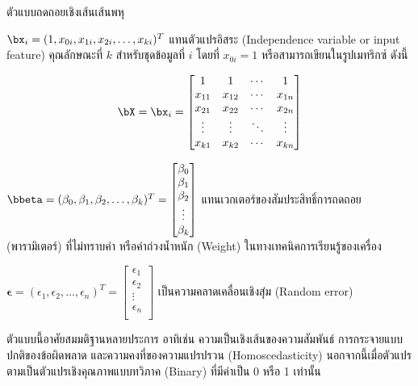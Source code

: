 \begin{myBox}[]{ตัวแบบถดถอยเชิงเส้นเส้นพหุ}{}

\indent\indent
$\bx_i = (1, x_{0i},x_{1i}, x_{2i}, \ldots, x_{ki})^T$ แทนตัวแปรอิสระ (Independence variable or input feature) คุณลักษณะที่ $k$ สำหรับชุดข้อมูลที่ $i$
โดยที่ $x_{0i}=1$ หรือสามารถเขียนในรูปเมทริกซ์ ดังนี้

$$\bX=\bx_i=\begin{bmatrix}
	1 & 1 & \cdots  & 1 \\
	x_{11}& x_{12}& \cdots  & x_{1n} \\
	x_{21}& x_{22}& \cdots & x_{2n}  \\
	\vdots & \vdots  & \ddots  & \vdots  \\
	x_{k1}& x_{k2} & \cdots  & x_{kn} \\
\end{bmatrix}$$

\indent\indent
$\bbeta = (\beta_0, \beta_1, \beta_2, \ldots, \beta_k)^T=\begin{bmatrix}
	\beta_{0}\\
	\beta_{1} \\
	\beta_{2} \\
	\vdots \\
	\beta_{k} \\
\end{bmatrix}$ แทนเวกเตอร์ของสัมประสิทธิ์การถดถอย (พารามิเตอร์) ที่ไม่ทราบค่า หรือค่าถ่วงน้ำหนัก (Weight) ในทางเทคนิคการเรียนรู้ของเครื่อง

\indent\indent
$\bm{\epsilon}=(\epsilon_1, \epsilon_2, \ldots, \epsilon_n)^T=\begin{bmatrix}
	\epsilon_{1} \\
	\epsilon_{2} \\
	\vdots \\
	\epsilon_{n} \\
\end{bmatrix}$ เป็นความคลาดเคลื่อนเชิงสุ่ม (Random error)
\end{myBox}


ตัวแบบนี้อาศัยสมมติฐานหลายประการ อาทิเช่น ความเป็นเชิงเส้นของความสัมพันธ์ การกระจายแบบปกติของข้อผิดพลาด และความคงที่ของความแปรปรวน (Homoscedasticity) นอกจากนี้เมื่อตัวแปรตามเป็นตัวแปรเชิงคุณภาพแบบทวิภาค (Binary) ที่มีค่าเป็น 0 หรือ 1 เท่านั้น


